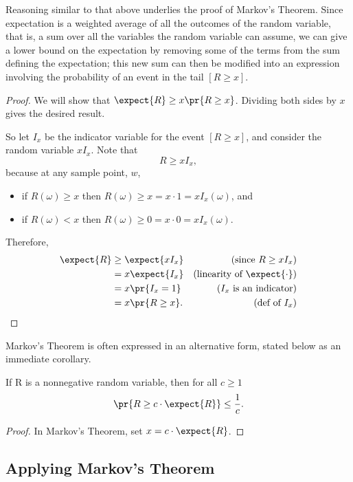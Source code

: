 Reasoning similar to that above underlies the proof of Markov's
Theorem.  Since expectation is a weighted average of all the outcomes
of the random variable, that is, a sum over all the variables the random
variable can assume, we can give a lower bound on the expectation by
removing some of the terms from the sum defining the expectation; this
new sum can then be modified into an expression involving the
probability of an event in the tail $[R \geq x]$.
\fi

\begin{proof}%
We will show that $\expect{R} \geq x \pr{R \geq x}$.  Dividing
both sides by $x$ gives the desired result.

So let $I_x$ be the indicator variable for the event $[R \geq x]$, and
consider the random variable $x I_x$.  Note that
\[
R \geq x I_x,
\]
because at any sample point, $w$,
\begin{itemize}
\item if $R(\omega) \geq x$ then $R(\omega) \geq x = x\cdot 1 = x I_x(\omega)$, and
\item if $R(\omega) < x$ then $R(\omega) \geq 0 = x \cdot 0 = xI_x(\omega)$.
\end{itemize}
Therefore,
\begin{align*}
\expect{R} & \geq \expect{x I_x} & (\text{since } R \geq xI_x)\\
   & = x \expect{I_x} & \text{(linearity of $\expect{\cdot}$)}\\
   & = x \pr{I_x=1}  &  \text{($I_x$ is an indicator)}\\
   & = x \pr{R \geq x}.  &  (\text{def\ of $I_x$})
\end{align*}
\end{proof}

Markov's Theorem is often expressed in an alternative form, stated
below as an immediate corollary.
\begin{corollary}
If R is a nonnegative random variable, then for all $c \geq 1$
\begin{equation*}
\pr{R \geq c \cdot \expect{R}}  \leq  \frac{1}{c}.
\end{equation*}
\end{corollary}
\begin{proof}
In Markov's Theorem, set $x = c \cdot \expect{R}$.

\end{proof}


\subsection{Applying Markov's Theorem}

